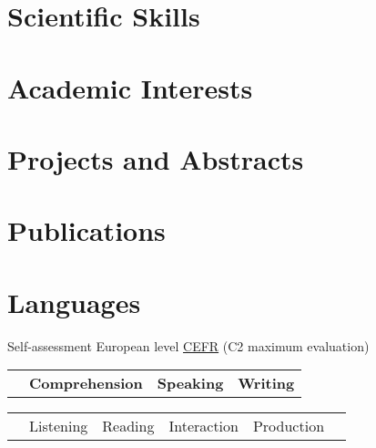 \documentclass[11pt,a4paper]{moderncv}
\begin{document}
\section{Scientific Skills}
\vspace{-3mm}
\section{Academic Interests}
\vspace{-3mm}
\section{Projects and Abstracts}
\vspace{-3mm}
\section{Publications}
\vspace{-3mm}
\section{Languages}
\hspace{25mm}\small  Self-assessment European level \href{http://europass.cedefop.europa.eu/en/resources/european-language-levels-cefr}{CEFR} (C2 maximum evaluation)\normalsize
\vspace{5mm}
\begin{tabular}{p{67mm} p{40mm} p{40mm} p{20mm}}
& \textbf{Comprehension} & \textbf{Speaking} & \textbf{Writing} \\
\end{tabular}
\begin{tabular}{p{67mm} p{20mm} p{20mm} p{20mm} p{20mm} p{20mm}}
& Listening & Reading & Interaction & Production & \\
\end{tabular}
\vspace{3mm}
\end{document}
